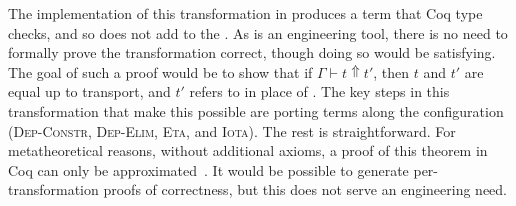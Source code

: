 The implementation of this transformation in \toolnamec produces a term that Coq type checks, and so does not
add to the .
As \toolnamec is an engineering tool, there is no need to formally prove the transformation correct, though doing so would be satisfying.
The goal of such a proof would be to show that %
if $\Gamma \vdash t \Uparrow t'$,
then $t$ and $t'$ are equal up to transport, and $t'$ refers to \B in place of \Aa.
The key steps in this transformation that make this possible are porting terms along the configuration %
(\textsc{Dep-Constr}, \textsc{Dep-Elim}, \textsc{Eta}, and \textsc{Iota}).
The rest is straightforward.
For metatheoretical reasons, without additional axioms, a proof of this theorem in Coq can only be approximated~\cite{tabareau2017equivalences}.
It would be possible to generate per-transformation proofs of correctness, but this does not serve an engineering need.


